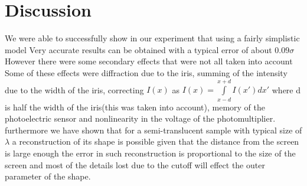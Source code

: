 \section{Discussion}
We were able to successfully show in our experiment that using a fairly simplistic model
Very accurate results can be obtained with a typical error of about $0.09\sigma$
However there were some secondary effects that were not all taken into account
Some of these effects were diffraction due to the iris, summing of the intensity due to the width of the iris, correcting $I(x)$ as
$I(x)=\int\limits_{x-d}^{x+d}I(x')dx'$ where d is half the width of the iris(this was taken into account),
memory of the photoelectric sensor and nonlinearity in the voltage of the photomultiplier.
furthermore we have shown that for a semi-translucent sample with typical size of $\lambda$ a reconstruction of its shape
is possible given that the distance from the screen is large enough the error in such reconstruction is proportional to the
size of the screen and most of the details lost due to the cutoff will effect the outer parameter of the shape.

